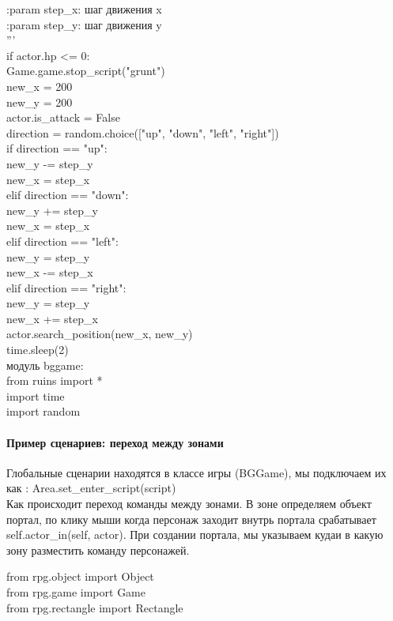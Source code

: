 :param step\_x: шаг движения x\\
:param step\_y: шаг движения y\\
'''\\
if actor.hp <= 0:\\
Game.game.stop\_script("grunt")\\
new\_x = 200\\
new\_y = 200\\
actor.is\_attack = False\\
direction = random.choice(["up", "down", "left", "right"])\\
if direction == "up":\\
new\_y -= step\_y\\
new\_x = step\_x\\
elif direction == "down":\\
new\_y += step\_y\\
new\_x = step\_x\\
elif direction == "left":\\
new\_y = step\_y\\
new\_x -= step\_x\\
elif direction == "right":\\
new\_y = step\_y\\
new\_x += step\_x\\

actor.search\_position(new\_x, new\_y)\\

time.sleep(2)\\

модуль bggame:\\
from ruins import *\\
import time\\
import random\\

\paragraph{Пример сценариев: переход между зонами}
Глобальные сценарии находятся в классе игры (BGGame), мы подключаем их как :
Area.set\_enter\_script(script)\\
Как происходит переход команды между зонами.
В зоне определяем объект портал, по клику мыши когда персонаж заходит внутрь портала срабатывает self.actor\_in(self, actor). При создании портала, мы указываем кудаи в какую зону разместить команду персонажей.

from rpg.object import Object\\
from rpg.game import Game\\
from rpg.rectangle import Rectangle\\

